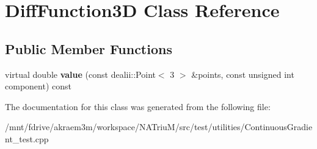 \hypertarget{classDiffFunction3D}{
\section{DiffFunction3D Class Reference}
\label{classDiffFunction3D}
}
\subsection*{Public Member Functions}
\begin{DoxyCompactItemize}
\item 
\hypertarget{classDiffFunction3D_a7fb1fe9820e72a600f0a19859a45c7c5}{
virtual double {\bfseries value} (const dealii::Point$<$ 3 $>$ \&points, const unsigned int component) const }
\label{classDiffFunction3D_a7fb1fe9820e72a600f0a19859a45c7c5}

\end{DoxyCompactItemize}


The documentation for this class was generated from the following file:\begin{DoxyCompactItemize}
\item 
/mnt/fdrive/akraem3m/workspace/NATriuM/src/test/utilities/ContinuousGradient\_\-test.cpp\end{DoxyCompactItemize}
